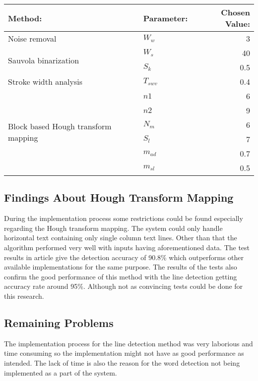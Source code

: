 \documentclass{article}
\begin{document}
      \begin{center}
          \begin{tabular}{|l|l|r|}
              \hline
              Method: & Parameter: & Chosen Value: \\ \hline
              Noise removal & $W_w$ & 3 \\ \hline
              \multirow{2}{*}{Sauvola binarization} & $W_s$ & 40 \\
              & $S_k$ & 0.5 \\ \hline
              Stroke width analysis & $T_{swv}$ & 0.4 \\ \hline
              \multirow{6}{*}{Block based Hough transform mapping} & $n1$ & 6 \\
              & $n2$ & 9 \\
              & $N_m$ & 6 \\
              & $S_l$ & 7 \\
              & $m_{ad}$ & 0.7 \\
              & $m_{sl}$ & 0.5 \\ \hline
          \end{tabular}
      \end{center}

    \subsection{Findings About Hough Transform Mapping}
      During the implementation process some restrictions could be found especially regarding the Hough transform mapping. The system could only handle horizontal text containing only single column text lines. Other than that the algorithm performed very well with inputs having aforementioned data. The test results in article \cite{Louloudis2} give the detection accuracy of 90.8\% which outperforms other available implementations for the same purpose. The results of the tests also confirm the good performance of this method with the line detection getting accuracy rate around 95\%. Although not as convincing tests could be done for this research.

    \subsection{Remaining Problems}
    \label{sec:remainingproblems}
      The implementation process for the line detection method was very laborious and time consuming so the implementation might not have as good performance as intended. The lack of time is also the reason for the word detection not being implemented as a part of the system.
\end{document}
